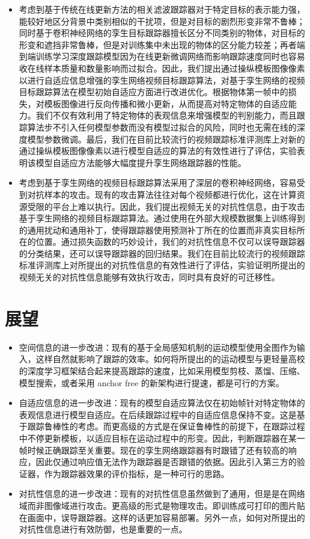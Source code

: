\begin{itemize}
\item 考虑到基于传统在线更新方法的相关滤波跟踪器对于特定目标的表示能力强，能较好地区分背景中类别相似的干扰项，但是对目标的剧烈形变非常不鲁棒；同时基于卷积神经网络的孪生目标跟踪器擅长区分不同类别的物体，对目标的形变和遮挡非常鲁棒，但是对训练集中未出现的物体的区分能力较差；再者端到端训练学习深度跟踪模型因为在线更新微调网络而影响跟踪速度同时也容易收在线样本质量和数量影响而过拟合。因此，我们提出通过操纵模板图像像素以进行自适应信息增强的孪生网络视频目标跟踪算法，对基于孪生网络的视频目标跟踪算法在模型初始自适应方面进行改进优化。根据物体第一帧中的损失，对模板图像进行反向传播和微小更新，从而提高对特定物体的自适应能力。我们不仅有效利用了特定物体的表观信息来增强模型的判别能力，而且跟踪算法步不引入任何模型参数而没有模型过拟合的风险，同时也无需在线的深度模型参数微调。最后，我们在目前比较流行的视频跟踪标准评测库上对新的通过操纵模板图像像素以进行模型自适应的算法的有效性进行了评估，实验表明该模型自适应方法能够大幅度提升孪生网络跟踪器的性能。
\item 考虑到基于孪生网络的视频目标跟踪算法采用了深层的卷积神经网络，容易受到对抗样本的攻击。现有的攻击算法往往对每个视频都进行优化，这在计算资源受限的平台上难以执行。因此，我们提出视频无关的对抗性信息，由于攻击基于孪生网络的视频目标跟踪算法。通过使用在外部大规模数据集上训练得到的通用扰动和通用补丁，使得跟踪器使用预测补丁所在的位置而非真实目标所在的位置。通过损失函数的巧妙设计，我们的对抗性信息不仅可以误导跟踪器的分类结果，还可以误导跟踪器的回归结果。我们在目前比较流行的视频跟踪标准评测库上对所提出的对抗性信息的有效性进行了评估，实验证明所提出的视频无关的对抗性信息能够有效执行攻击，同时具有良好的可迁移性。
\end{itemize}
\section{展望}
\begin{itemize}
\item 空间信息的进一步改进：现有的基于全局感知机制的运动模型使用全图作为输入，这样自然就影响了跟踪的效率。如何将所提出的的运动模型与更轻量高校的深度学习框架结合起来提高跟踪的速度，比如采用模型剪枝、蒸馏、压缩、模型搜索，或者采用 anchor free 的新架构进行提速，都是可行的方案。
\item 自适应信息的进一步改进：现有的模型自适应算法仅在初始帧针对特定物体的表观信息进行模型自适应。在后续跟踪过程中的自适应信息保持不变。这是基于跟踪鲁棒性的考虑。而更高级的方式是在保证鲁棒性的前提下，在跟踪过程中不停更新模板，以适应目标在运动过程中的形变。因此，判断跟踪器在某一帧时候正确跟踪至关重要。现在的孪生网络跟踪器有时跟错了还有较高的响应，因此仅通过响应值无法作为跟踪器是否跟错的依据。因此引入第三方的验证器，作为跟踪器效果的评价指标，是一种可行的思路。
\item 对抗性信息的进一步改进：现有的对抗性信息虽然做到了通用，但是是在网络域而非图像域进行攻击。更高级的形式是物理攻击。即训练成可打印的图片贴在画面中，误导跟踪器。这样的话更加容易部署。另外一点，如何对所提出的对抗性信息进行有效防御，也是重要的一点。
\end{itemize}